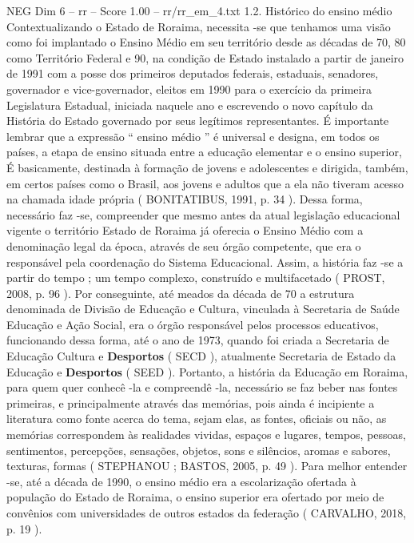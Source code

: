 \begin{textsample}{NEG Dim 6 – rr – Score 1.00 – rr/rr\_em\_4.txt}  \label{ex:f6_neg_080}
1.2.
Histórico do ensino médio Contextualizando o Estado de Roraima, necessita -se que tenhamos uma visão como foi implantado o Ensino Médio em seu território desde as décadas de 70, 80 como Território Federal e 90, na condição de Estado instalado a partir de janeiro de 1991 com a posse dos primeiros deputados federais, estaduais, senadores, governador e vice-governador, eleitos em 1990 para o exercício da primeira Legislatura Estadual, iniciada naquele ano e escrevendo o novo capítulo da História do Estado governado por seus legítimos representantes.
É importante lembrar que a expressão “ ensino médio ” é universal e designa, em todos os países, a etapa de ensino situada entre a educação elementar e o ensino superior, É basicamente, destinada à formação de jovens e adolescentes e dirigida, também, em certos países como o Brasil, aos jovens e adultos que a ela não tiveram acesso na chamada idade própria ( BONITATIBUS, 1991, p. 34 ).
Dessa forma, necessário faz -se, compreender que mesmo antes da atual legislação educacional vigente o território Estado de Roraima já oferecia o Ensino Médio com a denominação legal da época, através de seu órgão competente, que era o responsável pela coordenação do Sistema Educacional.
Assim, a história faz -se a partir do tempo ; um tempo complexo, construído e multifacetado ( PROST, 2008, p. 96 ).
Por conseguinte, até meados da década de 70 a estrutura denominada de Divisão de Educação e Cultura, vinculada à Secretaria de Saúde Educação e Ação Social, era o órgão responsável pelos processos educativos, funcionando dessa forma, até o ano de 1973, quando foi criada a Secretaria de Educação Cultura e \textbf{Desportos} ( SECD ), atualmente Secretaria de Estado da Educação e \textbf{Desportos} ( SEED ).
Portanto, a história da Educação em Roraima, para quem quer conhecê -la e compreendê -la, necessário se faz beber nas fontes primeiras, e principalmente através das memórias, pois ainda é incipiente a literatura como fonte acerca do tema, sejam elas, as fontes, oficiais ou não, as memórias correspondem às realidades vividas, espaços e lugares, tempos, pessoas, sentimentos, percepções, sensações, objetos, sons e silêncios, aromas e sabores, texturas, formas ( STEPHANOU ; BASTOS, 2005, p. 49 ).
Para melhor entender -se, até a década de 1990, o ensino médio era a escolarização ofertada à população do Estado de Roraima, o ensino superior era ofertado por meio de convênios com universidades de outros estados da federação ( CARVALHO, 2018, p. 19 ).

\end{textsample}
